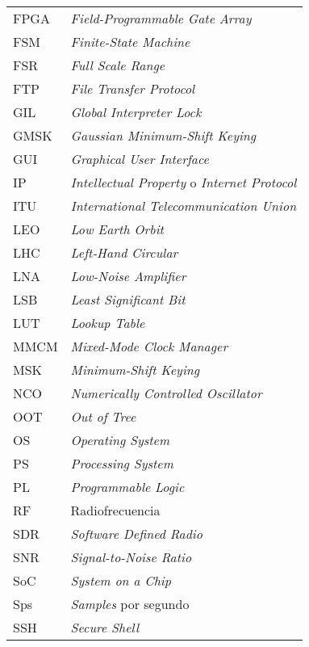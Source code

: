 \documentclass[screen, pagebackref,oneside]{ibtesis}
\begin{document}
\begin{preliminary}
\begin{abreviaturas}
\begin{longtable}{ll}
            FPGA &  \textit{Field-Programmable Gate Array} \\
            FSM &   \textit{Finite-State Machine}   \\
            FSR &   \textit{Full Scale Range}   \\
            FTP &   \textit{File Transfer Protocol} \\
            GIL &   \textit{Global Interpreter Lock}    \\
            GMSK &  \textit{Gaussian Minimum-Shift Keying} \\
            GUI &   \textit{Graphical User Interface}   \\
            IP &    \textit{Intellectual Property} o \textit{Internet Protocol} \\
            ITU &   \textit{International Telecommunication Union} \\
            LEO &   \textit{Low Earth Orbit}        \\
            LHC &   \textit{Left-Hand Circular}     \\
            LNA &   \textit{Low-Noise Amplifier}    \\
            LSB &   \textit{Least Significant Bit}  \\
            LUT &   \textit{Lookup Table}   \\
            MMCM &  \textit{Mixed-Mode Clock Manager} \\
            MSK &   \textit{Minimum-Shift Keying}  \\
            NCO &   \textit{Numerically Controlled Oscillator}  \\
            OOT &   \textit{Out of Tree}    \\
            OS  &   \textit{Operating System}   \\
            PS  &   \textit{Processing System}  \\
            PL  &   \textit{Programmable Logic} \\
            RF  &   Radiofrecuencia                 \\
            SDR &   \textit{Software Defined Radio} \\
            SNR &   \textit{Signal-to-Noise Ratio}  \\
            SoC &   \textit{System on a Chip}       \\
            Sps &   \textit{Samples} por segundo   \\
            SSH &   \textit{Secure Shell}   \\

\end{longtable}
\end{abreviaturas}
\end{preliminary}
\end{document}

